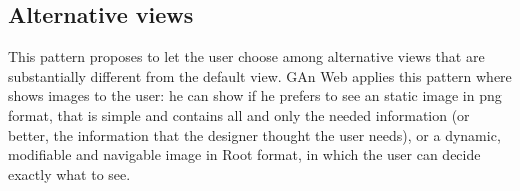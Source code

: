 
\subsection{Alternative views}
This pattern proposes to let the user choose among alternative views that are substantially different from the default view. 
GAn Web applies this pattern where shows images to the user: he can show if he prefers to see an static image in png format, that is simple and contains all and only the needed information (or better, the information that the designer thought the user needs), or a dynamic, modifiable and navigable image in Root format, in which the user can decide exactly what to see.


 